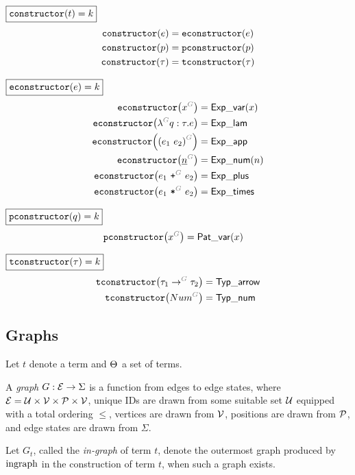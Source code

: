\noindent $\boxed{\constructor{t} = k}$
%
\begin{align*}
  \constructor{e} &= \econstructor{e} \\
  \constructor{p} &= \pconstructor{p} \\
  \constructor{\tau} &= \tconstructor{\tau}
\end{align*}

\noindent $\boxed{\econstructor{e} = k}$
%
\begin{align*}
  \econstructor{\eVar{G}{x}} &= \ExpVar(x) \\
  \econstructor{\eFun{G}{q}{\tau}{e}} &= \ExpLam \\
  \econstructor{\eApp{G}{e_1}{e_2}} &= \ExpApp \\
  \econstructor{\eNum{G}{n}} &= \ExpNum(n) \\
  \econstructor{\ePlus{G}{e_1}{e_2}} &= \ExpPlus \\
  \econstructor{\eTimes{G}{e_1}{e_2}} &= \ExpTimes
\end{align*}

\noindent $\boxed{\pconstructor{q} = k}$
%
\begin{align*}
  \pconstructor{\pVar{G}{x}} &= \PatVar(x)
\end{align*}

\noindent $\boxed{\tconstructor{\tau} = k}$
%
\begin{align*}
  \tconstructor{\tArrow{G}{\tau_1}{\tau_2}} &= \TypArrow \\
  \tconstructor{\tNum{G}} &= \TypNum
\end{align*}


\subsection{Graphs}

Let $t$ denote a term and $\Set$ a set of terms.

\begin{definition}
  A \emph{graph} $G : \E \rightarrow \Sigma$ is a function from edges to edge states,
  where $\E = \U \times \V \times \P \times \V$,
  unique IDs are drawn from some suitable set $\U$ equipped with a total ordering $\leq$,
  vertices are drawn from $\V$,
  positions are drawn from $\P$,
  and edge states are drawn from $\Sigma$.
\end{definition}

Let $G_t$, called the \emph{in-graph} of term $t$,
denote the outermost graph produced by $\ingraphOp$ in the construction of term $t$,
when such a graph exists.

